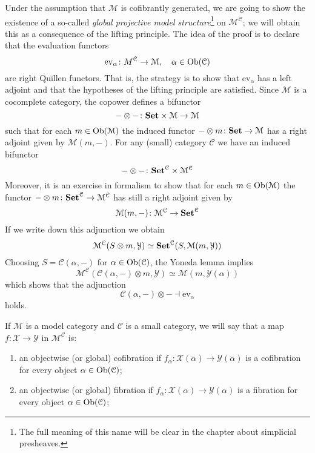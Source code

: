 \begin{refsection}
Under the assumption that $\mathcal M$ is cofibrantly generated, we are going to show the existence of a so-called \emph{global projective model structure}\footnote{The full meaning of this name will be clear in the chapter about simplicial presheaves.} on $\mathcal M^{\mathcal C}$; we will obtain this as a consequence of the lifting principle. The idea of the proof is to declare that the evaluation functors
\[
\mathrm{ev}_\alpha \colon M^{\mathcal C} \to \mathcal M, \quad \alpha \in \operatorname{Ob}(\mathcal C)
\]
are right Quillen functors. That is, the strategy is to show that $\mathrm{ev}_\alpha$ has a left adjoint and that the hypotheses of the lifting principle are satisfied. Since $\mathcal M$ is a cocomplete category, the copower defines a bifunctor
\[
- \otimes - \colon \mathbf{Set} \times \mathcal M \to \mathcal M
\]
such that for each $m \in \operatorname{Ob}(\mathcal M)$ the induced functor $- \otimes m \colon \mathbf{Set} \to \mathcal M$ has a right adjoint given by $\mathcal M(m,-)$. For any (small) category $\mathcal C$ we have an induced bifunctor
\[
- \otimes - \colon \mathbf{Set}^{\mathcal C} \times \mathcal M^{\mathcal C}
\]
Moreover, it is an exercise in formalism to show that for each $m \in \operatorname{Ob}(\mathcal M)$ the functor $- \otimes m \colon \mathbf{Set}^{\mathcal C} \to \mathcal M^{\mathcal C}$ has still a right adjoint given by
\[
\mathcal M(m,-) \colon \mathcal M^{\mathcal C} \to \mathbf{Set}^{\mathcal C}
\]
If we write down this adjunction we obtain
\[
\mathcal M^{\mathcal C}(S \otimes m, \mathcal Y) \simeq \mathbf{Set}^{\mathcal C}(S, \mathcal M(m, \mathcal Y))
\]
Choosing $S = \mathcal C(\alpha,-)$ for $\alpha \in \operatorname{Ob}(\mathcal C)$, the Yoneda lemma implies
\[
\mathcal M^{\mathcal C}(\mathcal C(\alpha,-) \otimes m, \mathcal Y) \simeq \mathcal M(m,\mathcal Y(\alpha))
\]
which shows that the adjunction
\[
\mathcal C(\alpha,-) \otimes - \dashv \mathrm{ev}_\alpha
\]
holds.

\begin{defin}
If $\mathcal M$ is a model category and $\mathcal C$ is a small category, we will say that a map $f \colon \mathcal X \to \mathcal Y$ in $\mathcal M^{\mathcal C}$ is:
\begin{enumerate}
\item an objectwise (or global) cofibration if $f_\alpha \colon \mathcal X(\alpha) \to \mathcal Y(\alpha)$ is a cofibration for every object $\alpha \in \operatorname{Ob}(\mathcal C)$;

\item an objectwise (or global) fibration if $f_\alpha \colon \mathcal X(\alpha) \to \mathcal Y(\alpha)$ is a fibration for every object $\alpha \in \operatorname{Ob}(\mathcal C)$;


\end{enumerate}
\end{defin}
\end{refsection}
